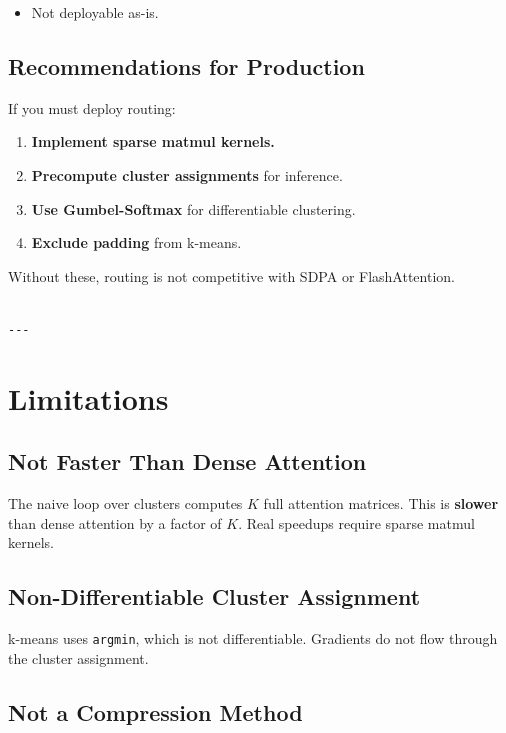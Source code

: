 \begin{itemize}
\item Not deployable as-is.

\end{itemize}
\subsection{Recommendations for Production}

If you must deploy routing:

\begin{enumerate}
\item \textbf{Implement sparse matmul kernels.}
\item \textbf{Precompute cluster assignments} for inference.
\item \textbf{Use Gumbel-Softmax} for differentiable clustering.
\item \textbf{Exclude padding} from k-means.

\end{enumerate}
Without these, routing is not competitive with SDPA or FlashAttention.
\begin{lstlisting}

---
\end{lstlisting}


\section{Limitations}

\subsection{Not Faster Than Dense Attention}

The naive loop over clusters computes $K$ full attention matrices. This is 
\textbf{slower} than dense attention by a factor of $K$. Real speedups require 
sparse matmul kernels.

\subsection{Non-Differentiable Cluster Assignment}

k-means uses \texttt{argmin}, which is not differentiable. Gradients do not flow 
through the cluster assignment.

\subsection{Not a Compression Method}


